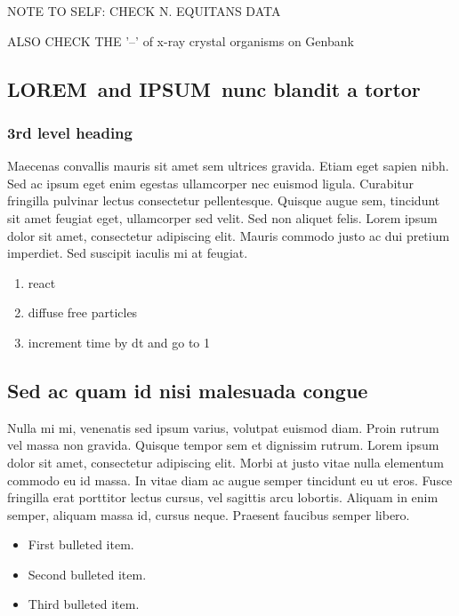 \documentclass[10pt,letterpaper]{article}
\newcommand{\lorem}{{\bf LOREM}}
\newcommand{\ipsum}{{\bf IPSUM}}
\begin{document}
NOTE TO SELF: CHECK N. EQUITANS DATA

ALSO CHECK THE '--' of x-ray crystal organisms on Genbank

\subsection*{\lorem\ and \ipsum\ nunc blandit a tortor}
\subsubsection*{3rd level heading} 
Maecenas convallis mauris sit amet sem ultrices gravida. Etiam eget sapien nibh. Sed ac ipsum eget enim egestas ullamcorper nec euismod ligula. Curabitur fringilla pulvinar lectus consectetur pellentesque. Quisque augue sem, tincidunt sit amet feugiat eget, ullamcorper sed velit. Sed non aliquet felis. Lorem ipsum dolor sit amet, consectetur adipiscing elit. Mauris commodo justo ac dui pretium imperdiet. Sed suscipit iaculis mi at feugiat. 

\begin{enumerate}
	\item{react}
	\item{diffuse free particles}
	\item{increment time by dt and go to 1}
\end{enumerate}


\subsection*{Sed ac quam id nisi malesuada congue}

Nulla mi mi, venenatis sed ipsum varius, volutpat euismod diam. Proin rutrum vel massa non gravida. Quisque tempor sem et dignissim rutrum. Lorem ipsum dolor sit amet, consectetur adipiscing elit. Morbi at justo vitae nulla elementum commodo eu id massa. In vitae diam ac augue semper tincidunt eu ut eros. Fusce fringilla erat porttitor lectus cursus, vel sagittis arcu lobortis. Aliquam in enim semper, aliquam massa id, cursus neque. Praesent faucibus semper libero.

\begin{itemize}
	\item First bulleted item.
	\item Second bulleted item.
	\item Third bulleted item.
\end{itemize}
\end{document}
